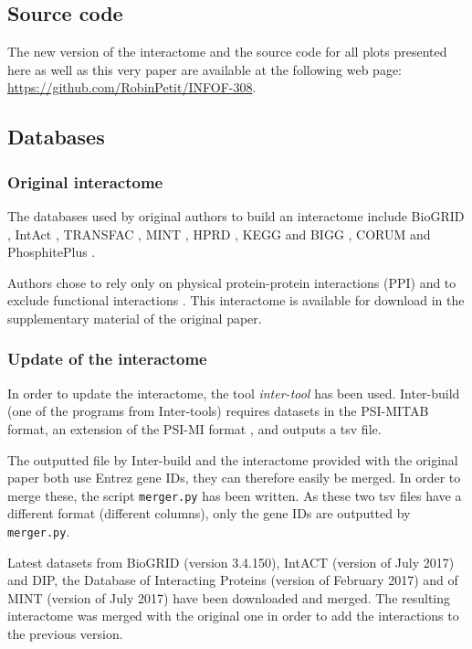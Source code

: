 \documentclass[letterpaper]{article}
\begin{document}
	\subsection{Source code}
	The new version of the interactome and the source code for all plots presented here as well as this
	very paper are available at the following web page: \url{https://github.com/RobinPetit/INFOF-308}.

	\subsection{Databases}
		\subsubsection{Original interactome}
		The databases used by original authors to build an interactome include BioGRID \citep{chatr2017biogrid},
		IntAct \citep{kerrien2011intact}, TRANSFAC \citep{matys2003transfac}, MINT \citep{licata2011mint}, HPRD
		\citep{keshava2008HPRD}, KEGG and BIGG \citep{lee2008KEGG-BIGG}, CORUM \citep{ruepp2009corum} and
		PhosphitePlus \citep{hornbeck2011phosphositeplus}.

		Authors chose to rely only on physical protein-protein interactions (PPI) and to exclude functional
		interactions \citep{caldera2017interactome}. This interactome is available for download in the
		supplementary material of the original paper.

		\subsubsection{Update of the interactome}
		In order to update the interactome, the tool \textit{inter-tool} \citep{inter-tools} has been used.
		Inter-build (one of the programs from Inter-tools) requires datasets in the PSI-MITAB format, an extension of the
		PSI-MI format \citep{MITABFormat}, and outputs a tsv file.

		The outputted file by Inter-build and the interactome provided with the original paper both use Entrez
		gene IDs, they can therefore easily be merged. In order to merge these, the script \texttt{merger.py}
		has been written. As these two tsv files have a different format (different columns), only the gene IDs
		are outputted by \texttt{merger.py}.

		Latest datasets from BioGRID (version 3.4.150), IntACT (version of July 2017) and DIP, the Database of
		Interacting Proteins (version of February 2017) \citep{salwinski2004DIP} and of MINT (version of July
		2017) have been downloaded and merged. The resulting interactome was merged with the original one in
		order to add the interactions to the previous version.
\end{document}
